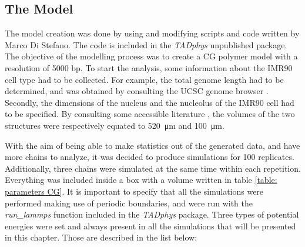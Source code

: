 
\subsection{The Model} \label{chap: the model description}
The model creation was done by using and modifying scripts and code written by Marco Di Stefano. The code is included in the \textit{TADphys} unpublished package.
The objective of the modelling process was to create a CG polymer model with a resolution of 5000 bp. To start the analysis, some information about the IMR90 cell type had to be collected. For example, the total genome length had to be determined, and was obtained by consulting the UCSC genome browser
\cite{UCSCGenomeBrowser}.
Secondly, the dimensions of the nucleus and the nucleolus of the IMR90 cell had to be specified. By consulting some accessible literature
\cite{ehlerHumanFoetalLung1996,ingramHiCImplementationGenome2020,maiserSuperresolutionSituAnalysis2020},
the volumes of the two structures were respectively equated to \SI{520}{\micro\metre} and \SI{100}{\micro\metre}.\\
\cite{ConadCorsoLodi}

With the aim of being able to make statistics out of the generated data, and have more chains to analyze, it was decided to produce simulations for 100 replicates. Additionally, three chains were simulated at the same time within each repetition. Everything was included inside a box with a volume written in table \ref{table: parameters CG}. 
It is important to specify that all the simulations were performed making use of periodic boundaries, and were run with the \textit{run\_lammps} function included in the \textit{TADphys} package.
Three types of potential energies were set and always present in all the simulations that will be presented in this chapter. Those are described in the list below:

